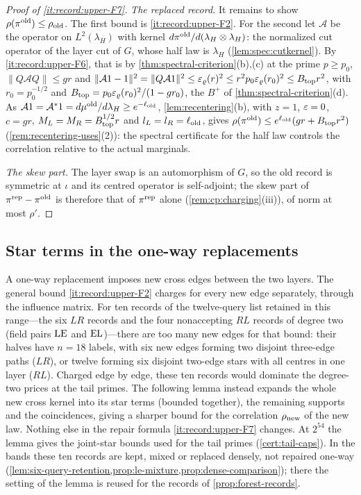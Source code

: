 \begin{proof}[Proof of \ref{it:record:upper-F7}]
\emph{The replaced record.} It remains to show $\rho(\pi^{\rm old})\le\rho_{\rm old}$.
The first bound is \ref{it:record:upper-F2}. For the second let $\mathcal A$
be the operator on $L^2(\lambda_H)$ with kernel
$d\pi^{\rm old}/d(\lambda_H\otimes\lambda_H)$: the normalized cut operator of
the layer cut of $G$, whose half law is $\lambda_H$ (\cref{lem:spec:cutkernel}).
By \ref{it:record:upper-F6}, that is by \cref{thm:spectral-criterion}(b),(c)
at the prime $p\ge p_0$, $\|Q\mathcal AQ\|\le gr$ and
$\|\mathcal A1-1\|^2=\|Q\mathcal A1\|^2\le\varepsilon_\varrho(r)^2\le
r^2p_0\varepsilon_\varrho(r_0)^2\le B_{\rm top}r^2$, with $r_0=p_0^{-1/2}$ and
$B_{\rm top}=p_0\varepsilon_\varrho(r_0)^2/(1-gr_0)$, the $B^+$ of
\cref{thm:spectral-criterion}(d). As
$\mathcal A1=\mathcal A^*1=d\mu^{\rm old}/d\lambda_H\ge e^{-\ell_{\rm old}}$,
\cref{lem:recentering}(b), with $z=1$, $\varepsilon=0$, $c=gr$,
$M_L=M_R=B_{\rm top}^{1/2}r$ and $l_L=l_R=\ell_{\rm old}$, gives
$\rho(\pi^{\rm old})\le e^{\ell_{\rm old}}(gr+B_{\rm top}r^2)$
(\cref{rem:recentering-uses}(2)): the spectral certificate for the half law
controls the correlation relative to the actual marginals.

\emph{The skew part.} The layer swap is an automorphism of $G$, so the old
record is symmetric at $\iota$ and its centred operator is self-adjoint; the
skew part of $\pi^{\rm rep}-\pi^{\rm old}$ is therefore that of $\pi^{\rm rep}$
alone (\cref{rem:cp:charging}(iii)), of norm at most $\rho'$.
\end{proof}

\subsection{Star terms in the one-way replacements}\label{subsec:upper-stars}

A one-way replacement imposes new cross edges between the two
layers. The general bound \ref{it:record:upper-F2} charges for
every new edge separately, through the influence matrix. For ten
records of the twelve-query list retained in this range---the six
$LR$ records and the four nonaccepting $RL$ records of degree two
(field pairs $\rm LE$ and $\rm EL$)---there are too many new edges
for that bound: their halves have $n=18$ labels, with six new
edges forming two disjoint three-edge paths ($LR$), or twelve
forming six disjoint two-edge stars with all centres in one layer
($RL$). Charged edge by edge, these ten records would dominate the
degree-two prices at the tail primes. The following lemma instead
expands the whole new cross kernel into its star terms (bounded
together), the remaining supports and the coincidences, giving a
sharper bound for the correlation $\rho_{\rm new}$ of the new law.
Nothing else in the repair formula
\ref{it:record:upper-F7} changes. At $2^{54}$ the lemma gives the
joint-star bounds used for the tail primes
(\cref{cert:tail-caps}). In the bands these ten records are kept,
mixed or replaced densely, not repaired one-way
(\cref{lem:six-query-retention,prop:le-mixture,prop:dense-comparison});
there the setting of the lemma is reused for the records of
\cref{prop:forest-records}.

